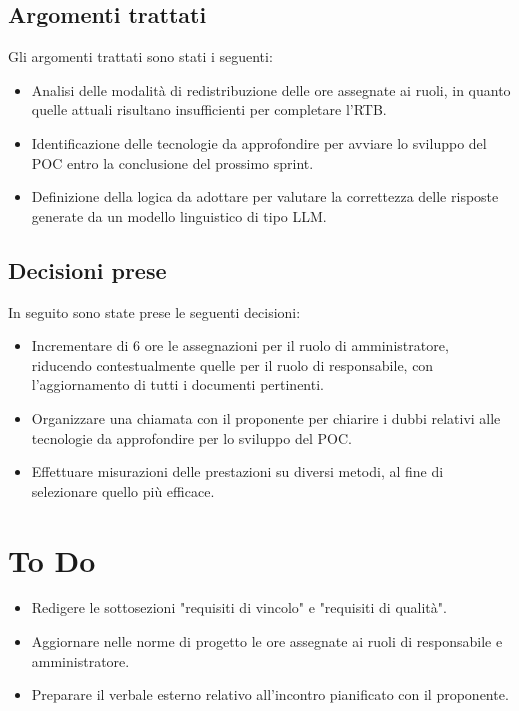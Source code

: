 \documentclass[a4paper, 12pt]{article}
\begin{document}
\subsection{Argomenti trattati}
Gli argomenti trattati sono stati i seguenti:
\begin{itemize}
    \item Analisi delle modalit\`a di redistribuzione delle ore assegnate ai ruoli, in quanto quelle attuali risultano insufficienti per completare l'RTB.
    \item Identificazione delle tecnologie da approfondire per avviare lo sviluppo del POC entro la conclusione del prossimo sprint.
    \item Definizione della logica da adottare per valutare la correttezza delle risposte generate da un modello linguistico di tipo LLM.
\end{itemize}

\subsection{Decisioni prese}
In seguito sono state prese le seguenti decisioni:
\begin{itemize}
    \item Incrementare di 6 ore le assegnazioni per il ruolo di amministratore, riducendo contestualmente quelle per il ruolo di responsabile, con l'aggiornamento di tutti i documenti pertinenti.
    \item Organizzare una chiamata con il proponente per chiarire i dubbi relativi alle tecnologie da approfondire per lo sviluppo del POC.
    \item Effettuare misurazioni delle prestazioni su diversi metodi, al fine di selezionare quello pi\`u efficace.
\end{itemize}

\section{To Do}
\begin{itemize}
    \item Redigere le sottosezioni "requisiti di vincolo" e "requisiti di qualit\`a".
    \item Aggiornare nelle norme di progetto le ore assegnate ai ruoli di responsabile e amministratore.
    \item Preparare il verbale esterno relativo all'incontro pianificato con il proponente.
\end{itemize}
\end{document}
